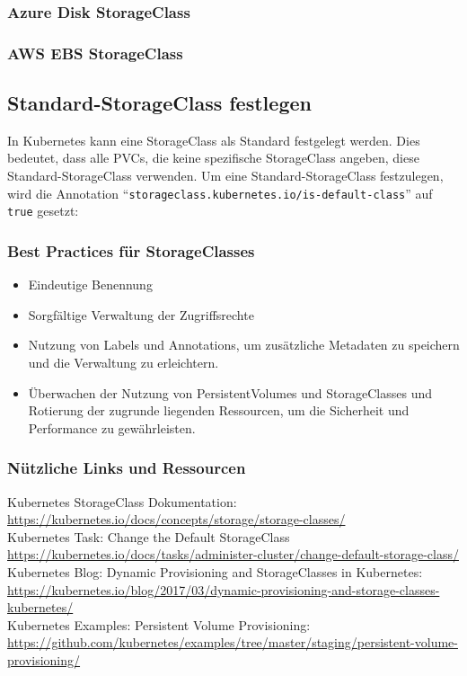 \subsubsection{Azure Disk StorageClass}


\subsubsection{AWS EBS StorageClass}

\newpage
\subsection{Standard-StorageClass festlegen}
In Kubernetes kann eine StorageClass als Standard festgelegt werden. Dies bedeutet, dass alle PVCs, die keine spezifische StorageClass angeben, diese Standard-StorageClass verwenden. Um eine Standard-StorageClass festzulegen, wird die Annotation \enquote{\texttt{storageclass.kubernetes.io/is-default-class}} auf \texttt{true} gesetzt:


\subsubsection{Best Practices für StorageClasses}

\begin{itemize}
  \item Eindeutige Benennung
  \item Sorgfältige Verwaltung der Zugriffsrechte
  \item Nutzung von Labels und Annotations, um zusätzliche Metadaten zu speichern und die Verwaltung zu erleichtern.
  \item Überwachen der Nutzung von PersistentVolumes und StorageClasses und Rotierung der zugrunde liegenden Ressourcen, um die Sicherheit und Performance zu gewährleisten.
\end{itemize}

\subsubsection{Nützliche Links und Ressourcen}
Kubernetes StorageClass Dokumentation:\\
\url{https://kubernetes.io/docs/concepts/storage/storage-classes/}\\
Kubernetes Task: Change the Default StorageClass\\
\url{https://kubernetes.io/docs/tasks/administer-cluster/change-default-storage-class/}\\
Kubernetes Blog: Dynamic Provisioning and StorageClasses in Kubernetes:\\
\url{https://kubernetes.io/blog/2017/03/dynamic-provisioning-and-storage-classes-kubernetes/}\\
Kubernetes Examples: Persistent Volume Provisioning:\\
\url{https://github.com/kubernetes/examples/tree/master/staging/persistent-volume-provisioning/}


